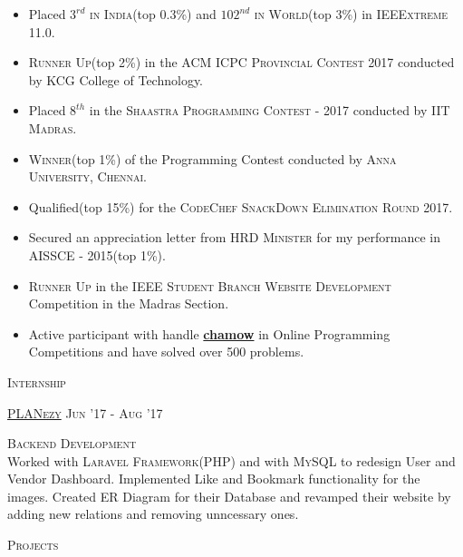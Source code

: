 \documentclass[10pt]{article}
\begin{document}
	\begin{itemize}
	\setlength\itemsep{-0.25em}
	\item Placed \textsc{$3^{rd}$ in India}(top 0.3\%) and \textsc{$102^{nd}$ in World}(top 3\%) in \textsc{IEEExtreme 11.0}.
	\item \textsc{Runner Up}(top 2\%) in the \textsc{ACM ICPC Provincial Contest 2017} conducted by KCG College of Technology.
	\item Placed \textsc{$8^{th}$} in the \textsc{Shaastra Programming Contest - 2017} conducted by \textsc{IIT Madras}.
	\item \textsc{Winner}(top 1\%) of the Programming Contest conducted by \textsc{Anna University, Chennai}.
	\item Qualified(top 15\%) for the \textsc{CodeChef SnackDown Elimination Round 2017}.
	\item Secured an appreciation letter from \textsc{HRD Minister} for my performance in \textsc{AISSCE - 2015}(top 1\%).
	\item \textsc{Runner Up} in the \textsc{IEEE Student Branch Website Development} Competition in the Madras Section.
	\item Active participant with handle \textbf{\href{https://chamow97.github.io/Competitive-Coding/}{chamow}} in Online Programming Competitions and have solved over 500 problems.

	
	\end{itemize}
	\vspace{2mm}
	{\centering\Large{\textsc{Internship}}	\hrulefill}
	
	\vspace{2mm}
	
	\large\textsc{\href{http://planezy.com/}{PLANezy}}
	\hfill{\small{\textsc{Jun '17 - Aug '17}}}
	
	\begin{changemargin}{1.0cm}{0.0cm} 
	{
	\large{\textsc{{Backend Development}}}  \\
	\small{Worked with \textsc{Laravel Framework}(PHP) and with \textsc{MySQL} to redesign User and Vendor Dashboard. Implemented Like and Bookmark functionality for the images. Created ER Diagram for their Database and revamped their website by adding new relations and removing unncessary ones.} 		
	}
	\end{changemargin} 	 	
	\vspace{2mm}

	{\centering\Large{\textsc{Projects}} \hrulefill}
		
	\vspace{3mm}
	
\end{document}
